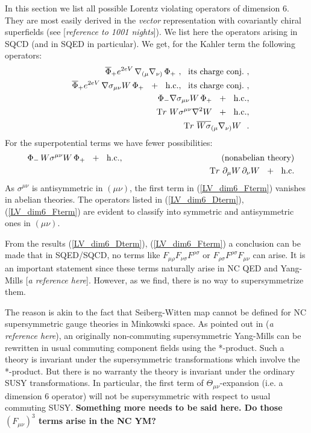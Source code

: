 \documentclass[paper,12pt]{revtex4}
\begin{document}
	In this section we list all possible Lorentz violating
        operators of dimension 6. 
        They are most easily derived in the {\it vector} representation
        with covariantly chiral superfields 
	(see [\emph{reference to 1001 nights}]). 
        We list here the operators arising in SQCD (and in SQED in particular).
        We get, for the Kahler term the following operators:
\begin{eqnarray}
\label{LV_dim6_Dterm}
\nonumber
  &&  \overline{\Phi}_+ e^{2eV}\, \nabla_{(\mu} \nabla_{\nu)} \,\Phi_+ 
               ~,~~ {\rm its\ charge\ conj.}~, \\
\nonumber
  &&  \overline{\Phi}_+ e^{2eV}\, \nabla\sigma_{\mu\nu}W \,\Phi_+ 
        ~~+~~  {\rm h.c.},~~ {\rm its\ charge\ conj.}~, \\
  &&  \Phi_- \nabla\sigma_{\mu\nu}W \,\Phi_+
        ~~+~~  {\rm h.c.}, \\
\nonumber
  &&  {\mathrm Tr} ~ W\sigma^{\mu\nu}\nabla^2 W 
        ~~+~~  {\rm h.c.}, \\
\nonumber
  &&  {\mathrm Tr} ~ \overline{W \sigma}_{ (\mu}\nabla_{\nu)} W~~.
\end{eqnarray}
        For the superpotential terms we have fewer possibilities:
\begin{eqnarray}
\label{LV_dim6_Fterm}
\nonumber
      && \Phi_-\, W\sigma^{\mu\nu}W \,\Phi_+ ~~+~~ {\rm h.c.},
        ~~~~~~~~~~~~~~~~~~~~~~~~~~~~~~~~~~~{\rm (nonabelian\ theory)} \\
      && {\mathrm Tr} ~ \partial_\mu W \, \partial_\nu W ~~+~~ 
		 {\rm h.c.}
\end{eqnarray}
        As $ \sigma^{\mu\nu} $ is antisymmetric in $ (\mu\nu) $, 
	the first term in (\ref{LV_dim6_Fterm}) vanishes in 
	abelian theories.
	The operators listed in (\ref{LV_dim6_Dterm}), (\ref{LV_dim6_Fterm})
	are evident to classify into symmetric and antisymmetric
	ones in $ (\mu\nu) $.
	
	From the results (\ref{LV_dim6_Dterm}), 
	(\ref{LV_dim6_Fterm}) a conclusion can be
	made that in SQED/SQCD, no terms like 
  $ F_{\mu\rho}F_{\nu\sigma}F^{\rho\sigma} $
	or
  $ F_{\rho\sigma}F^{\rho\sigma}F_{\mu\nu} $
	can arise.
	It is an important statement since these terms naturally
	arise in NC QED and Yang-Mills [{\it a reference here}].
	However, as we find, there is no way to supersymmetrize them.

	The reason is akin to the fact that Seiberg-Witten map cannot
	be defined for NC supersymmetric gauge theories in Minkowski space.
	As pointed out in ({\it a reference here}), an originally 
	non-commuting supersymmetric Yang-Mills can be rewritten in
	usual commuting component fields using the *-product.
	Such a theory is invariant under the supersymmetric transformations
	which involve the *-product.
	But there is no warranty the theory is invariant under the
	ordinary SUSY transformations.
	In particular, the first term of $ \Theta_{\mu\nu} $-expansion 
	(i.e. a dimension 6 operator) will not be supersymmetric
	with respect to usual commuting SUSY.
	{\bf Something more needs to be said here. Do those 
	  $ (F_{\mu\nu})^3 $ terms arise in the NC YM?}
\end{document}
